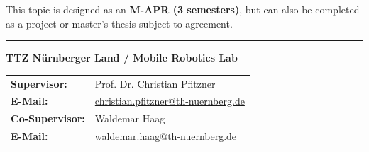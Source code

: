 \documentclass{ohm_project_description}
\begin{document}
\vspace{0.5cm}
This topic is designed as an \textbf{M-APR (3 semesters)}, but can also be completed as a project or master's thesis subject to agreement.

\vfill
\textcolor{ohm_red}{\rule{\linewidth}{0.4mm}}
\textbf{\textcolor{ohm_red}{TTZ Nürnberger Land / Mobile Robotics Lab}} \\
\begin{tabular}{@{}ll}
\textbf{Supervisor:}    & Prof. Dr. Christian Pfitzner \\
\textbf{E-Mail:}        & \href{mailto:christian.pfitzner@th-nuernberg.de}{christian.pfitzner@th-nuernberg.de} \\
\textbf{Co-Supervisor:} & Waldemar Haag \\
\textbf{E-Mail:}        & \href{mailto:waldemar.haag@th-nuernberg.de}{waldemar.haag@th-nuernberg.de} \\
\end{tabular}
\end{document}
